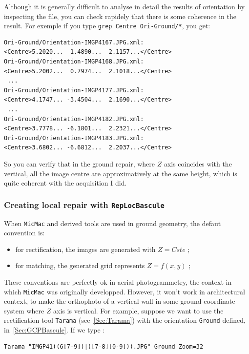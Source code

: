 Although it is generally difficult to analyse in detail the results of orientation
by inspecting the file, you can check rapidely that there is some coherence in the result.
For exemple if you type {\tt grep Centre Ori-Ground/*}, you get:


{\scriptsize
\begin{verbatim}
Ori-Ground/Orientation-IMGP4167.JPG.xml:               <Centre>5.2020...  1.4890...  2.1157...</Centre>
Ori-Ground/Orientation-IMGP4168.JPG.xml:               <Centre>5.2002...  0.7974...  2.1018...</Centre>
 ...
Ori-Ground/Orientation-IMGP4177.JPG.xml:               <Centre>4.1747... -3.4504...  2.1690...</Centre>
 ...
Ori-Ground/Orientation-IMGP4182.JPG.xml:               <Centre>3.7778... -6.1801...  2.2321...</Centre>
Ori-Ground/Orientation-IMGP4183.JPG.xml:               <Centre>3.6802... -6.6812...  2.2037...</Centre>
\end{verbatim}
}

So you can verify that in the ground repair, where $Z$ axis coincides with the vertical,
all the image centre are approximatively at the same height, which is quite coherent with
the acquisition I did.

\subsubsection{Creating local repair with {\tt RepLocBascule}}

\label{Sec:RepLocBascule}

When {\tt MicMac} and derived tools are used in ground geometry, the
defaut convention is:

\begin{itemize}
   \item  for rectification, the images are  generated with $Z=Cste$ ;
   \item  for matching, the generated grid represents $Z=f(x,y)$ ;
\end{itemize}


These conventions are perfectly ok in aerial photogrammetry, 
the context  in which {\tt MicMac} was originally developped. However,
it won't work in architectural context, to make the orthophoto of a
vertical wall in some ground coordinate system where $Z$ axis  is vertical.
For example, suppose we want to use the rectification tool {\tt Tarama} (see~\ref{Sec:Tarama})
with the orientation {\tt Ground} defined, in~\ref{Sec:GCPBascule}.
If we type :

\begin{verbatim}
Tarama "IMGP41((6[7-9])|([7-8][0-9])).JPG" Ground Zoom=32
\end{verbatim}


